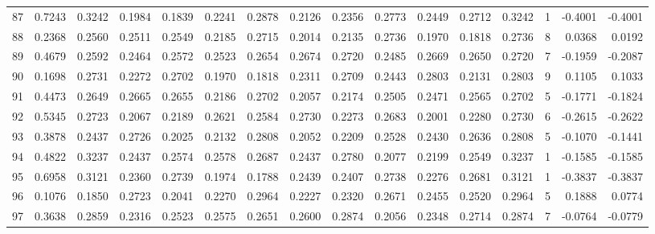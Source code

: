 \begin{tabular}{lrrrrrrrrrrrrrrr}
87  &      0.7243 &  0.3242 &  0.1984 &  0.1839 &  0.2241 &  0.2878 &  0.2126 &  0.2356 &  0.2773 &  0.2449 &   0.2712 &     0.3242 &      1 &                   -0.4001 &                    -0.4001 \\
88  &      0.2368 &  0.2560 &  0.2511 &  0.2549 &  0.2185 &  0.2715 &  0.2014 &  0.2135 &  0.2736 &  0.1970 &   0.1818 &     0.2736 &      8 &                    0.0368 &                     0.0192 \\
89  &      0.4679 &  0.2592 &  0.2464 &  0.2572 &  0.2523 &  0.2654 &  0.2674 &  0.2720 &  0.2485 &  0.2669 &   0.2650 &     0.2720 &      7 &                   -0.1959 &                    -0.2087 \\
90  &      0.1698 &  0.2731 &  0.2272 &  0.2702 &  0.1970 &  0.1818 &  0.2311 &  0.2709 &  0.2443 &  0.2803 &   0.2131 &     0.2803 &      9 &                    0.1105 &                     0.1033 \\
91  &      0.4473 &  0.2649 &  0.2665 &  0.2655 &  0.2186 &  0.2702 &  0.2057 &  0.2174 &  0.2505 &  0.2471 &   0.2565 &     0.2702 &      5 &                   -0.1771 &                    -0.1824 \\
92  &      0.5345 &  0.2723 &  0.2067 &  0.2189 &  0.2621 &  0.2584 &  0.2730 &  0.2273 &  0.2683 &  0.2001 &   0.2280 &     0.2730 &      6 &                   -0.2615 &                    -0.2622 \\
93  &      0.3878 &  0.2437 &  0.2726 &  0.2025 &  0.2132 &  0.2808 &  0.2052 &  0.2209 &  0.2528 &  0.2430 &   0.2636 &     0.2808 &      5 &                   -0.1070 &                    -0.1441 \\
94  &      0.4822 &  0.3237 &  0.2437 &  0.2574 &  0.2578 &  0.2687 &  0.2437 &  0.2780 &  0.2077 &  0.2199 &   0.2549 &     0.3237 &      1 &                   -0.1585 &                    -0.1585 \\
95  &      0.6958 &  0.3121 &  0.2360 &  0.2739 &  0.1974 &  0.1788 &  0.2439 &  0.2407 &  0.2738 &  0.2276 &   0.2681 &     0.3121 &      1 &                   -0.3837 &                    -0.3837 \\
96  &      0.1076 &  0.1850 &  0.2723 &  0.2041 &  0.2270 &  0.2964 &  0.2227 &  0.2320 &  0.2671 &  0.2455 &   0.2520 &     0.2964 &      5 &                    0.1888 &                     0.0774 \\
97  &      0.3638 &  0.2859 &  0.2316 &  0.2523 &  0.2575 &  0.2651 &  0.2600 &  0.2874 &  0.2056 &  0.2348 &   0.2714 &     0.2874 &      7 &                   -0.0764 &                    -0.0779 \\

\end{tabular}
